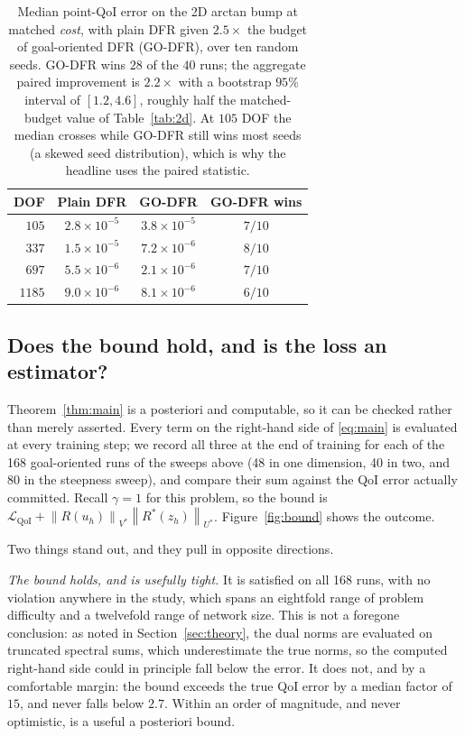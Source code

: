 \documentclass[preprint,11pt]{elsarticle}
\newcommand{\norm}[1]{\left\|#1\right\|}
\begin{document}
\begin{table}[htbp]
\centering
\caption{Median point-QoI error on the 2D arctan bump at matched \emph{cost}, with plain DFR given $2.5\times$ the budget of goal-oriented DFR (GO-DFR), over ten random seeds. GO-DFR wins $28$ of the $40$ runs; the aggregate paired improvement is $2.2\times$ with a bootstrap $95\%$ interval of $[1.2, 4.6]$, roughly half the matched-budget value of Table~\ref{tab:2d}. At $105$ DOF the median crosses while GO-DFR still wins most seeds (a skewed seed distribution), which is why the headline uses the paired statistic.}
\label{tab:matched-cost}
\begin{tabular}{rccc}
\toprule
DOF & Plain DFR & GO-DFR & GO-DFR wins \\
\midrule
$105$  & $2.8\times10^{-5}$ & $3.8\times10^{-5}$ & $7/10$ \\
$337$  & $1.5\times10^{-5}$ & $7.2\times10^{-6}$ & $8/10$ \\
$697$  & $5.5\times10^{-6}$ & $2.1\times10^{-6}$ & $7/10$ \\
$1185$ & $9.0\times10^{-6}$ & $8.1\times10^{-6}$ & $6/10$ \\
\bottomrule
\end{tabular}
\end{table}

\subsection{Does the bound hold, and is the loss an estimator?}
\label{sec:results-bound}

Theorem~\ref{thm:main} is a posteriori and computable, so it can be checked rather than merely asserted. Every term on the right-hand side of \eqref{eq:main} is evaluated at every training step; we record all three at the end of training for each of the 168 goal-oriented runs of the sweeps above (48 in one dimension, 40 in two, and 80 in the steepness sweep), and compare their sum against the QoI error actually committed. Recall $\gamma = 1$ for this problem, so the bound is $\mathcal{L}_{\mathrm{QoI}} + \norm{R(u_h)}_{V^*}\norm{R^*(z_h)}_{U^*}$. Figure~\ref{fig:bound} shows the outcome.

Two things stand out, and they pull in opposite directions.

\emph{The bound holds, and is usefully tight.} It is satisfied on all 168 runs, with no violation anywhere in the study, which spans an eightfold range of problem difficulty and a twelvefold range of network size. This is not a foregone conclusion: as noted in Section~\ref{sec:theory}, the dual norms are evaluated on truncated spectral sums, which underestimate the true norms, so the computed right-hand side could in principle fall below the error. It does not, and by a comfortable margin: the bound exceeds the true QoI error by a median factor of $15$, and never falls below $2.7$. Within an order of magnitude, and never optimistic, is a useful a posteriori bound.
\end{document}
